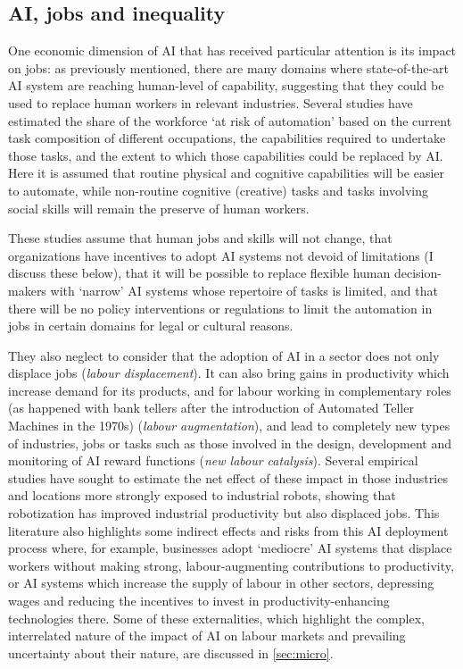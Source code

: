 \documentclass[11pt]{article}
\begin{document}
\subsection{AI, jobs and inequality}
\label{subsec:jobs}
One economic dimension of AI that has received particular attention is its impact on jobs: as previously mentioned, there are many domains where state-of-the-art AI system are reaching human-level of capability,  suggesting that they could be used to replace human workers in relevant industries. Several studies have estimated the share of the workforce `at risk of automation' based on the current task composition of different occupations, the capabilities required to undertake those tasks, and the extent to which those capabilities could be replaced by AI. Here it is assumed that routine physical and cognitive capabilities will be easier to automate, while non-routine cognitive (creative) tasks and tasks involving social skills will remain the preserve of human workers. 

These studies assume that human jobs and skills will not change, that organizations have incentives to adopt AI systems not devoid of limitations (I discuss these below), that it will be possible to replace flexible human decision-makers with `narrow' AI systems whose repertoire of tasks is limited, and that there will be no policy interventions or regulations to limit the automation in jobs in certain domains for legal or cultural reasons. 

They also neglect to consider that the adoption of AI in a sector does not only displace jobs (\textit{labour displacement}). It can also bring gains in productivity which increase demand for its products, and for labour working in complementary roles (as happened with bank tellers after the introduction of Automated Teller Machines in the 1970s) (\textit{labour augmentation}), and lead to completely new types of industries, jobs or tasks such as those involved in the design, development and monitoring of AI reward functions (\textit{new labour catalysis}). Several empirical studies have sought to estimate the net effect of these impact in those industries and locations more strongly exposed to industrial robots, showing that robotization has improved industrial productivity but also displaced jobs. This literature also highlights some indirect effects and risks from this AI deployment process where, for example, businesses adopt `mediocre' AI systems that displace workers without making strong, labour-augmenting contributions to productivity, or AI systems which increase the supply of labour in other sectors, depressing wages and reducing the incentives to invest in productivity-enhancing technologies there. Some of these externalities, which highlight the complex, interrelated nature of the impact of AI on labour markets and prevailing uncertainty about their nature, are discussed in \ref{sec:micro}.
\end{document}
